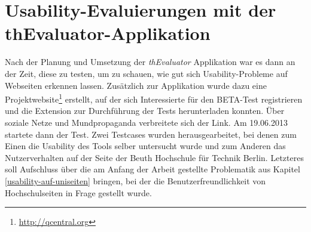 %
%
%
%

\chapter{Usability-Evaluierungen mit der thEvaluator-Applikation}

Nach der Planung und Umsetzung der \textit{thEvaluator} Applikation war es dann an der Zeit, diese zu testen, um zu schauen, wie gut sich Usability-Probleme auf Webseiten erkennen lassen. Zusätzlich zur Applikation wurde dazu eine Projektwebsite\footnote{\url{http://qcentral.org}} erstellt, auf der sich Interessierte für den BETA-Test registrieren und die Extension zur Durchführung der Tests herunterladen konnten. Über soziale Netze und Mundpropaganda verbreitete sich der Link. Am 19.06.2013 startete dann der Test. Zwei Testcases wurden herausgearbeitet, bei denen zum Einen die Usability des Tools selber untersucht wurde und zum Anderen das Nutzerverhalten auf der Seite der Beuth Hochschule für Technik Berlin. Letzteres soll Aufschluss über die am Anfang der Arbeit gestellte Problematik aus Kapitel \ref{usability-auf-uniseiten} bringen, bei der die Benutzerfreundlichkeit von Hochschulseiten in Frage gestellt wurde.


